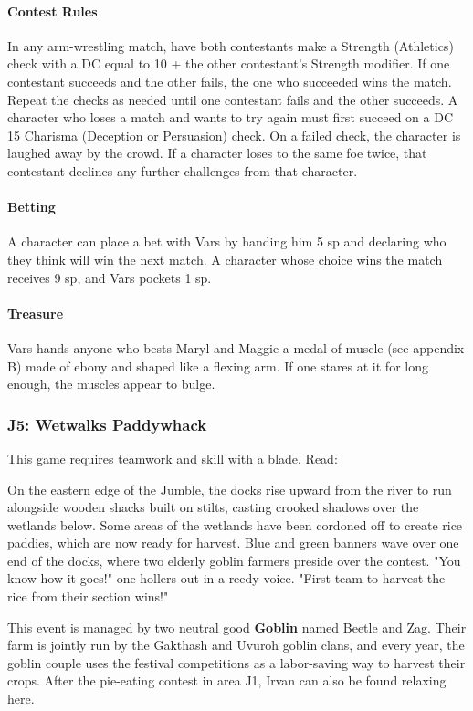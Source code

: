 \documentclass[10pt,a4,twoside,twocolumn,openany,nodeprecatedcode]{dndbook}
\begin{document}
\paragraph{Contest Rules}
In any arm-wrestling match, have both contestants make a Strength (Athletics) check with a DC equal to 10 + the other contestant's Strength modifier. If one contestant succeeds and the other fails, the one who succeeded wins the match. Repeat the checks as needed until one contestant fails and the other succeeds.
A character who loses a match and wants to try again must first succeed on a DC 15 Charisma (Deception or Persuasion) check. On a failed check, the character is laughed away by the crowd. If a character loses to the same foe twice, that contestant declines any further challenges from that character.
\paragraph{Betting}
A character can place a bet with Vars by handing him 5 sp and declaring who they think will win the next match. A character whose choice wins the match receives 9 sp, and Vars pockets 1 sp.
\paragraph{Treasure}
Vars hands anyone who bests Maryl and Maggie a medal of muscle (see appendix B) made of ebony and shaped like a flexing arm. If one stares at it for long enough, the muscles appear to bulge.
\subsubsection{J5: Wetwalks Paddywhack}
This game requires teamwork and skill with a blade. Read:
\begin{DndReadAloud}{}
On the eastern edge of the Jumble, the docks rise upward from the river to run alongside wooden shacks built on stilts, casting crooked shadows over the wetlands below. Some areas of the wetlands have been cordoned off to create rice paddies, which are now ready for harvest.
Blue and green banners wave over one end of the docks, where two elderly goblin farmers preside over the contest. "You know how it goes!" one hollers out in a reedy voice. "First team to harvest the rice from their section wins!"
\end{DndReadAloud}

This event is managed by two neutral good \textbf{Goblin} named Beetle and Zag. Their farm is jointly run by the Gakthash and Uvuroh goblin clans, and every year, the goblin couple uses the festival competitions as a labor-saving way to harvest their crops.
After the pie-eating contest in area J1, Irvan can also be found relaxing here.
\end{document}
